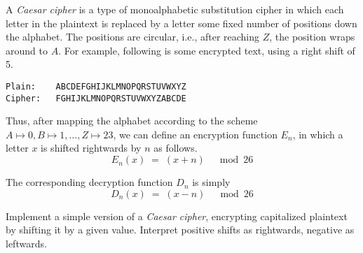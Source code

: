 

\problem A {\em Caesar cipher} is a type of monoalphabetic substitution cipher in which each letter
in the plaintext is replaced by a letter some fixed number of positions down the alphabet. The positions
are circular, i.e., after reaching $Z$, the position wraps around to $A$. For example, following is some encrypted
text, using a right shift of 5.

\begin{lstlisting}[numbers=none, xleftmargin=.25\textwidth, xrightmargin=.2\textwidth]
Plain:    ABCDEFGHIJKLMNOPQRSTUVWXYZ
Cipher:   FGHIJKLMNOPQRSTUVWXYZABCDE
\end{lstlisting}

Thus, after mapping the alphabet according to the scheme $A\mapsto 0, B\mapsto 1,\dots,Z\mapsto 23$, we can define
an encryption function $E_n$, in which a letter $x$ is shifted rightwards by $n$ as follows.
\begin{equation*}
	E_n(x)	\;=\;	(x + n)	\quad\bmod 26
\end{equation*}

The corresponding decryption function $D_n$ is simply
\begin{equation*}
	D_n(x)	\;=\;	(x - n)	\quad\bmod 26
\end{equation*}

Implement a simple version of a {\em Caesar cipher}, encrypting capitalized plaintext by shifting it by a given value.
Interpret positive shifts as rightwards, negative as leftwards.

\solution

\sourcecode
